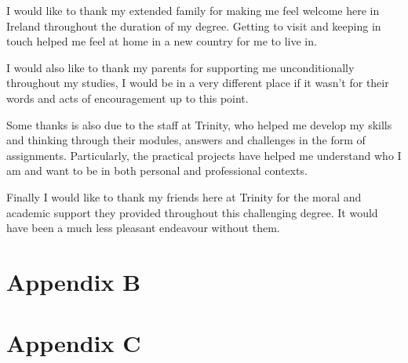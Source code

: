 \documentclass[a4paper, 12pt, oneside]{report}         %
\begin{document}
\begin{thesisacknowledgments}                     %
  I would like to thank my extended family for making me feel welcome here in Ireland throughout the duration of my degree. Getting to visit and keeping in touch helped me feel at home in a new country for me to live in.
  
  \noindent I would also like to thank my parents for supporting me unconditionally throughout my studies, I would be in a very different place if it wasn't for their words and acts of encouragement up to this point.
  
  \noindent Some thanks is also due to the staff at Trinity, who helped me develop my skills and thinking through their modules, answers and challenges in the form of assignments. Particularly, the practical projects have helped me understand who I am and want to be in both personal and professional contexts.
  
  \noindent Finally I would like to thank my friends here at Trinity for the moral and academic support they provided throughout this challenging degree. It would have been a much less pleasant endeavour without them.
\end{thesisacknowledgments}                       %
  
  
\tableofcontents                                  %
\listoftables                                     %
\listoffigures                                    %
\printglossary[type=\acronymtype, title={Acronyms}]











\begin{appendix}

\pagebreak
\chapter*{Appendix B}

\chapter*{Appendix C}


\end{appendix}
\end{document}
